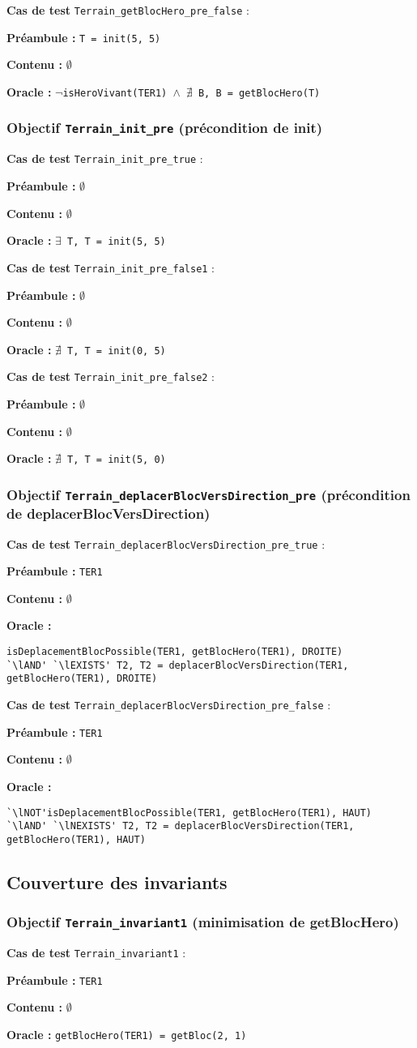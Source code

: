 \documentclass{article}
\newcommand{\cmd}[1]{\texttt{#1}}
\newcommand{\lAND}{$\land$}
\newcommand{\lNOT}{$\lnot$}
\newcommand{\lEXISTS}{$\exists$}
\newcommand{\lNEXISTS}{$\nexists{}$}
\newcommand{\obj}[2]{\subsubsection*{\large{\textbf{Objectif {\cmd{#1} (#2)}}}}}
\newenvironment{cas}[1]
{
	\hspace{1em}\textbf{Cas de test} \cmd{#1} :
	\begin{list}{}{}
}{
	\end{list}\vspace{1em}
}
\newcommand{\pre}[1]{\item \textbf{Préambule :} \cmd{#1}}
\newcommand{\npre}{\item \textbf{Préambule :} $\emptyset$}
\newcommand{\nope}{\item \textbf{Contenu :} $\emptyset$}
\newcommand{\ora}[1]{\item \textbf{Oracle :} \cmd{#1}}
\newcommand{\oram}{\item \textbf{Oracle :}}
\begin{document}
	\begin{cas} {Terrain\_getBlocHero\_pre\_false}
		\pre{T = init(5, 5)}
		\nope{}
		\ora{\lNOT{}isHeroVivant(TER1) \lAND{} \lNEXISTS{} B, B = getBlocHero(T)}
	\end{cas}

\obj{Terrain\_init\_pre} {précondition de init}
	\begin{cas} {Terrain\_init\_pre\_true}
		\npre{}
		\nope{}
		\ora{\lEXISTS{} T, T = init(5, 5)}
	\end{cas}

	\begin{cas} {Terrain\_init\_pre\_false1}
		\npre{}
		\nope{}
		\ora{\lNEXISTS{} T, T = init(0, 5)}
	\end{cas}

	\begin{cas} {Terrain\_init\_pre\_false2}
		\npre{}
		\nope{}
		\ora{\lNEXISTS{} T, T = init(5, 0)}
	\end{cas}

\obj{Terrain\_deplacerBlocVersDirection\_pre} {précondition de deplacerBlocVersDirection}
	\begin{cas} {Terrain\_deplacerBlocVersDirection\_pre\_true}
		\pre{TER1}
		\nope{}
		\oram{}
		\begin{lstlisting}
isDeplacementBlocPossible(TER1, getBlocHero(TER1), DROITE)
`\lAND' `\lEXISTS' T2, T2 = deplacerBlocVersDirection(TER1, getBlocHero(TER1), DROITE)
		\end{lstlisting}
	\end{cas}

	\begin{cas} {Terrain\_deplacerBlocVersDirection\_pre\_false}
		\pre{TER1}
		\nope{}
		\oram{}
		\begin{lstlisting}
`\lNOT'isDeplacementBlocPossible(TER1, getBlocHero(TER1), HAUT)
`\lAND' `\lNEXISTS' T2, T2 = deplacerBlocVersDirection(TER1, getBlocHero(TER1), HAUT)
		\end{lstlisting}
	\end{cas}

\subsection*{Couverture des invariants}

\obj{Terrain\_invariant1} {minimisation de getBlocHero}
	\begin{cas} {Terrain\_invariant1}
		\pre{TER1}
		\nope{}
		\ora{getBlocHero(TER1) = getBloc(2, 1)}
	\end{cas}
\end{document}
